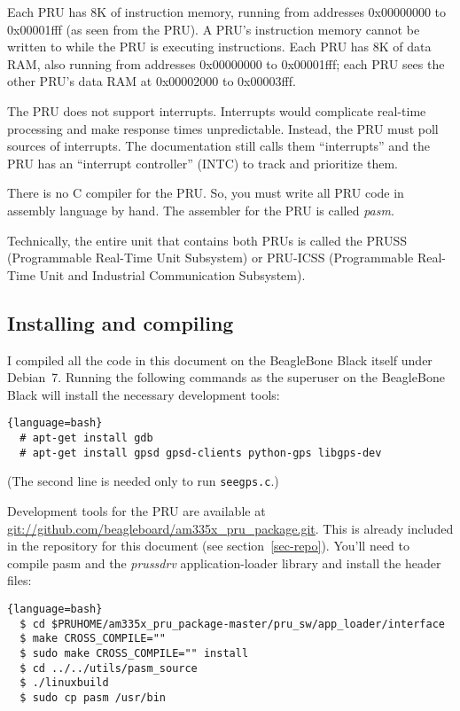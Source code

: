 \documentclass[letterpaper,11pt,fleqn]{article}
\begin{document}
Each PRU has 8K of instruction memory, running from addresses  0x00000000 to
0x00001fff (as seen from the PRU). A PRU's instruction memory cannot be
written to while the PRU is executing instructions. Each PRU has 8K of data
RAM, also running from addresses 0x00000000 to 0x00001fff; each PRU sees the
other PRU's data RAM at 0x00002000 to 0x00003fff.

The PRU does not support interrupts. Interrupts would complicate real-time
processing and make response times unpredictable. Instead, the PRU must poll
sources of interrupts. The documentation still calls them ``interrupts'' and 
the PRU has an ``interrupt controller'' (INTC) to track and prioritize them.

There is no C compiler for the PRU. So, you must write all PRU code in
assembly language by hand. The assembler for the PRU is called \textit{pasm}.

Technically, the entire unit that contains both PRUs is called the PRUSS
(Programmable Real-Time Unit Subsystem) or \mbox{PRU-ICSS} (Programmable
Real-Time Unit and Industrial Communication Subsystem).

\subsection{Installing and compiling}

I compiled all the code in this document on the BeagleBone Black itself under
Debian~7. Running the following commands as the superuser on the BeagleBone
Black will install the necessary development tools:

\begin{lstlisting}{language=bash}
  # apt-get install gdb
  # apt-get install gpsd gpsd-clients python-gps libgps-dev
\end{lstlisting}

\noindent
(The second line is needed only to run \texttt{seegps.c}.)

Development tools for the PRU are available at
\url{git://github.com/beagleboard/am335x\_pru\_package.git}. This is already
included in the repository for this document (see section~\ref{sec-repo}).
You'll need to compile pasm and the \textit{prussdrv} \label{sec-prussdrv}
application-loader library and install the header files:

\begin{lstlisting}{language=bash}
  $ cd $PRUHOME/am335x_pru_package-master/pru_sw/app_loader/interface
  $ make CROSS_COMPILE=""
  $ sudo make CROSS_COMPILE="" install
  $ cd ../../utils/pasm_source
  $ ./linuxbuild
  $ sudo cp pasm /usr/bin
\end{lstlisting}
\end{document}
